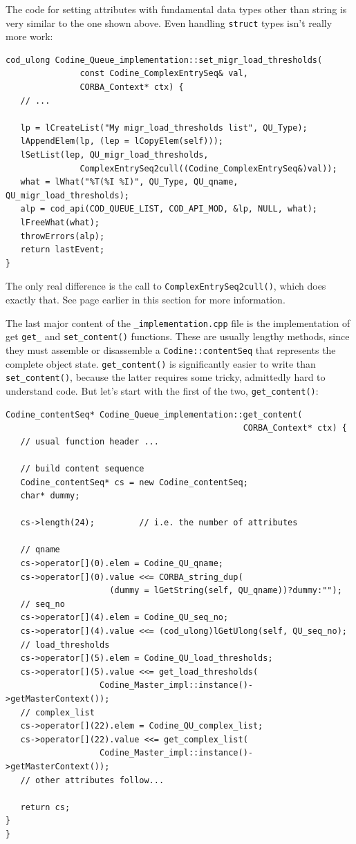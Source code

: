 The code for setting attributes with fundamental data types other than
string is very similar to the one shown above. Even handling \texttt{struct}
types isn't really more work:

\begin{Verbatim}[fontsize=\small, frame=single]
cod_ulong Codine_Queue_implementation::set_migr_load_thresholds(
               const Codine_ComplexEntrySeq& val, 
               CORBA_Context* ctx) {
   // ...

   lp = lCreateList("My migr_load_thresholds list", QU_Type);
   lAppendElem(lp, (lep = lCopyElem(self)));
   lSetList(lep, QU_migr_load_thresholds,
               ComplexEntrySeq2cull((Codine_ComplexEntrySeq&)val));
   what = lWhat("%T(%I %I)", QU_Type, QU_qname, QU_migr_load_thresholds);
   alp = cod_api(COD_QUEUE_LIST, COD_API_MOD, &lp, NULL, what);
   lFreeWhat(what);
   throwErrors(alp);
   return lastEvent;
}
\end{Verbatim}

The only real difference is the call to \texttt{ComplexEntrySeq2cull()},
which does exactly that. See page \pageref{p_converters} earlier in this
section for more information.

The last major content of the \texttt{\_implementation.cpp} file is the
implementation of get \texttt{get\_} and \texttt{set\_content()} functions.
These are usually lengthy methods, since they must assemble or disassemble a
\texttt{Codine::contentSeq} that represents the complete object state.
\texttt{get\_content()} is significantly easier to write than
\texttt{set\_content()}, because the latter requires some tricky, admittedly 
hard to understand code. But let's start with the first of the two,
\texttt{get\_content()}:

\begin{Verbatim}[fontsize=\small, frame=single]
Codine_contentSeq* Codine_Queue_implementation::get_content(
                                                CORBA_Context* ctx) {
   // usual function header ...

   // build content sequence
   Codine_contentSeq* cs = new Codine_contentSeq;
   char* dummy;

   cs->length(24);         // i.e. the number of attributes

   // qname
   cs->operator[](0).elem = Codine_QU_qname;
   cs->operator[](0).value <<= CORBA_string_dup(
                     (dummy = lGetString(self, QU_qname))?dummy:"");
   // seq_no
   cs->operator[](4).elem = Codine_QU_seq_no;
   cs->operator[](4).value <<= (cod_ulong)lGetUlong(self, QU_seq_no);
   // load_thresholds
   cs->operator[](5).elem = Codine_QU_load_thresholds;
   cs->operator[](5).value <<= get_load_thresholds(
                   Codine_Master_impl::instance()->getMasterContext());
   // complex_list
   cs->operator[](22).elem = Codine_QU_complex_list;
   cs->operator[](22).value <<= get_complex_list(
                   Codine_Master_impl::instance()->getMasterContext());
   // other attributes follow...
   
   return cs;
}
}\end{Verbatim}

